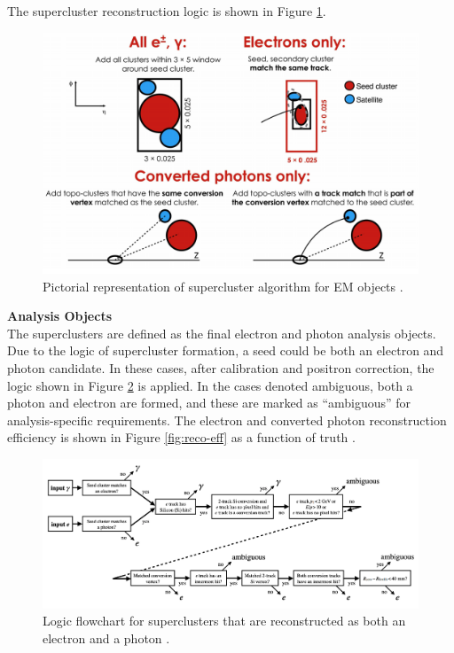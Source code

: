 The supercluster reconstruction logic is shown in Figure \ref{fig:supercluster-reco}.

\begin{figure}[h]
    \centering
    \includegraphics[width=.90\textwidth]{chapters/chapter3_eventreco/images/supercluster-formation.png}

    \caption[Pictorial representation of supercluster algorithm for \gls{EM} objects]{Pictorial representation of supercluster algorithm for \gls{EM} objects \cite{photon-electron-perf}.}
    \label{fig:supercluster-reco}
\end{figure}

\noindent\textbf{Analysis Objects}\\ 
\indent The superclusters are defined as the final electron and photon analysis objects. Due to the logic of supercluster formation, a seed could be both an electron and photon candidate. In these cases, after calibration and positron correction, the logic shown in Figure \ref{fig:ambiguity-logic} is applied. In the cases denoted ambiguous, both a photon and electron are formed, and these are marked as ``ambiguous'' for analysis-specific requirements. The electron and converted photon reconstruction efficiency is shown in Figure \ref{fig:reco-eff} as a function of truth \et.

\begin{figure}[h]
    \centering
    \includegraphics[width=1\textwidth]{chapters/chapter3_eventreco/images/egamma-amb.png}

    \caption[Logic flowchart for superclusters that are reconstructed as both an electron and a photon]{Logic flowchart for superclusters that are reconstructed as both an electron and a photon \cite{photon-electron-perf}.}
    \label{fig:ambiguity-logic}
\end{figure}



